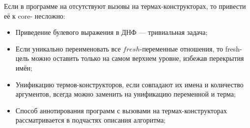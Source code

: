Если в программе на \miniKanren{} отсутствуют вызовы на термах-конструкторах, то привести её к core-\miniKanren{} несложно:
\begin{itemize}
    \item Приведение булевого выражения в ДНФ --- тривиальная задача;
    \item Если уникально переименовать все $fresh$-переменные отношения, то fresh-цель можно оставить только на самом верхнем уровне, избежав перекрытия имён;
    \item Унификацию термов-конструкторов, если совпадают их имена и количество аргументов, всегда можно заменить на унификацию переменной и терма;
    \item Способ аннотирования программ с вызовами на термах-конструкторах рассматривается в подчастях описания алгоритма;
\end{itemize}

